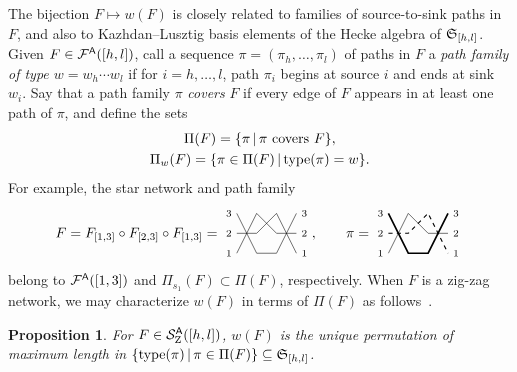 \documentclass[11pt]{article}
\newtheorem{prop}[theo]{Proposition}
\theoremstyle{definition}
\numberwithin{equation}{section}
\begin{document}
The bijection $F \mapsto w(F)$ is closely related to
families of source-to-sink paths in $F$, and also to Kazhdan--Lusztig
basis elements of the Hecke algebra of $\mathfrak{S}_{[h,l]}$. 
Given $F \in \mathcal F^{\mathsf{A}}([h,l])$,
call a sequence $\pi = (\pi_h,\dotsc,\pi_l)$ of paths in $F$
a {\em path family of type $w = w_h \cdots w_l$} if for $i = h,\dotsc,l$,
path $\pi_i$ begins at source $i$ and ends at sink $w_i$.
Say that a path family $\pi$ {\em covers} $F$ if every edge of $F$
appears in at least one path of $\pi$, and define the sets
\begin{equation}
  \begin{gathered}
    \Pi(F) = \{ \pi \,|\, \pi \text{ covers } F \},\\
    \Pi_w(F) = \{ \pi \in \Pi(F) \,|\, \mathrm{type}(\pi) = w \}.
  \end{gathered}
\end{equation}
For example,
the star network
and path family
\begin{equation}\label{eq:132313}
F = F_{[1,3]} \circ F_{[2,3]} \circ F_{[1,3]} = 
\begin{tikzpicture}[scale=.5,baseline=-10]
\node at (-.4,0.5) {$\scriptstyle 3$};
\node at (-.4,-0.5) {$\scriptstyle{2}$};
\node at (-.4,-1.5) {$\scriptstyle{1}$};  
\node at (3.4,0.5) {$\scriptstyle 3$};
\node at (3.4,-0.5) {$\scriptstyle{2}$};
\node at (3.4,-1.5) {$\scriptstyle{1}$};  
\draw[-] (0,0.5) -- (1,-1.5) -- (2,-1.5) -- (3,0.5);
\draw[-] (0,-0.5) -- (1,-0.5) -- (2,0.5) -- (3,-1.5);
\draw[-] (0,-1.5) -- (1,0.5) -- (2,-0.5) -- (3,-0.5);
\end{tikzpicture},\qquad
\pi = 
\begin{tikzpicture}[scale=.5,baseline=-10]
\node at (-.4,0.5) {$\scriptstyle 3$};
\node at (-.4,-0.5) {$\scriptstyle{2}$};
\node at (-.4,-1.5) {$\scriptstyle{1}$};  
\node at (3.4,0.5) {$\scriptstyle 3$};
\node at (3.4,-0.5) {$\scriptstyle{2}$};
\node at (3.4,-1.5) {$\scriptstyle{1}$};  
\draw[-, very thick] (0,0.5) -- (1,-1.5) -- (2,-1.5) -- (3,0.5);
\draw[-, thick, dashed] (0,-0.5) -- (1,-0.5) -- (2,0.5) -- (3,-1.5);
\draw[-] (0,-1.5) -- (1,0.5) -- (2,-0.5) -- (3,-0.5);
\end{tikzpicture}
\end{equation}
belong to $\mathcal F^{\mathsf{A}}([1,3])$ and $\Pi_{s_1}(F) \subset \Pi(F)$, respectively.
When $F$ is a zig-zag network,
we may characterize $w(F)$ in terms of $\Pi(F)$ as
follows~\cite[Lem.\,5.3]{SkanNNDCB}.
\begin{prop}\label{p:wFchar}  
  For $F \in \mathcal S^{\mathsf{A}}_{\mathrm Z}([h,l])$,
$w(F)$ is the unique permutation of maximum length in
$\{ \mathrm{type}(\pi) \,|\, \pi \in \Pi(F) \} \subseteq \mathfrak{S}_{[h,l]}$.
\end{prop}
\end{document}
